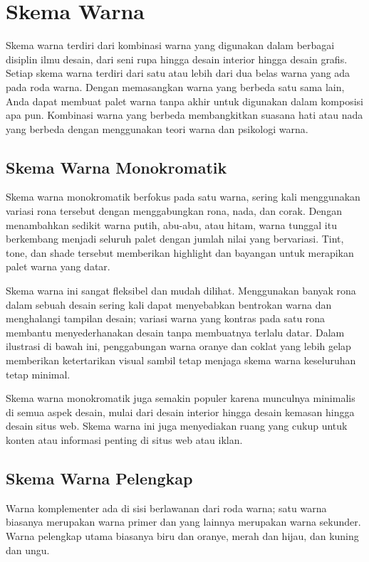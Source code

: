 \documentclass[a4paper]{article}
\begin{document}
\newpage

\section{Skema Warna}
Skema warna terdiri dari kombinasi warna yang digunakan dalam berbagai disiplin ilmu desain, dari seni rupa hingga desain interior hingga desain grafis. Setiap skema warna terdiri dari satu atau lebih dari dua belas warna yang ada pada roda warna. Dengan memasangkan warna yang berbeda satu sama lain, Anda dapat membuat palet warna tanpa akhir untuk digunakan dalam komposisi apa pun. Kombinasi warna yang berbeda membangkitkan suasana hati atau nada yang berbeda dengan menggunakan teori warna dan psikologi warna.

\subsection{Skema Warna Monokromatik}
Skema warna monokromatik berfokus pada satu warna, sering kali menggunakan variasi rona tersebut dengan menggabungkan rona, nada, dan corak. Dengan menambahkan sedikit warna putih, abu-abu, atau hitam, warna tunggal itu berkembang menjadi seluruh palet dengan jumlah nilai yang bervariasi. Tint, tone, dan shade tersebut memberikan highlight dan bayangan untuk merapikan palet warna yang datar.

Skema warna ini sangat fleksibel dan mudah dilihat. Menggunakan banyak rona dalam sebuah desain sering kali dapat menyebabkan bentrokan warna dan menghalangi tampilan desain; variasi warna yang kontras pada satu rona membantu menyederhanakan desain tanpa membuatnya terlalu datar. Dalam ilustrasi di bawah ini, penggabungan warna oranye dan coklat yang lebih gelap memberikan ketertarikan visual sambil tetap menjaga skema warna keseluruhan tetap minimal.

Skema warna monokromatik juga semakin populer karena munculnya minimalis di semua aspek desain, mulai dari desain interior hingga desain kemasan hingga desain situs web. Skema warna ini juga menyediakan ruang yang cukup untuk konten atau informasi penting di situs web atau iklan.

\subsection{Skema Warna Pelengkap}
Warna komplementer ada di sisi berlawanan dari roda warna; satu warna biasanya merupakan warna primer dan yang lainnya merupakan warna sekunder. Warna pelengkap utama biasanya biru dan oranye, merah dan hijau, dan kuning dan ungu.
\end{document}
